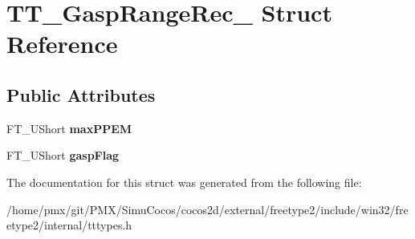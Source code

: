 \hypertarget{structTT__GaspRangeRec__}{}\section{T\+T\+\_\+\+Gasp\+Range\+Rec\+\_\+ Struct Reference}
\label{structTT__GaspRangeRec__}
\subsection*{Public Attributes}
\begin{DoxyCompactItemize}
\item 
\mbox{\label{structTT__GaspRangeRec___aa3fab31f6c0659b4deff402e210e15c9}} 
F\+T\+\_\+\+U\+Short {\bfseries max\+P\+P\+EM}
\item 
\mbox{\label{structTT__GaspRangeRec___a9fc298dc0e46d31507728ae25585118d}} 
F\+T\+\_\+\+U\+Short {\bfseries gasp\+Flag}
\end{DoxyCompactItemize}


The documentation for this struct was generated from the following file\+:\begin{DoxyCompactItemize}
\item 
/home/pmx/git/\+P\+M\+X/\+Simu\+Cocos/cocos2d/external/freetype2/include/win32/freetype2/internal/tttypes.\+h\end{DoxyCompactItemize}
